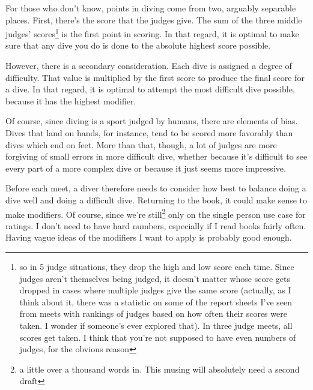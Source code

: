 \documentclass[12pt]{article}[titlepage]
\newcommand{\1}{\={a}}
\newcommand{\2}{\={e}}
\newcommand{\3}{\={\i}}
\newcommand{\4}{\=o}
\newcommand{\5}{\=u}
\newcommand{\6}{\={A}}
\renewcommand{\,}{\textsuperscript{,}}
\begin{document}
For those who don't know, points in diving come from two, arguably separable places.
First, there's the score that the judges give.
The sum of the three middle judges' scores\footnote{so in 5 judge situations, they drop the high and low score each time. Since judges aren't themselves being judged, it doesn't matter whose score gets dropped in cases where multiple judges give the same score (actually, as I think about it, there was a statistic on some of the report sheets I've seen from meets with rankings of judges based on how often their scores were taken. I wonder if someone's ever explored that). In three judge meets, all scores get taken. I think that you're not supposed to have even numbers of judges, for the obvious reason}
is the first point in scoring.
In that regard, it is optimal to make sure that any dive you do is done to the absolute highest score possible.

However, there is a secondary consideration.
Each dive is assigned a degree of difficulty.
That value is multiplied by the first score to produce the final score for a dive.
In that regard, it is optimal to attempt the most difficult dive possible, because it has the highest modifier.

Of course, since diving is a sport judged by humans, there are elements of bias.
Dives that land on hands, for instance, tend to be scored more favorably than dives which end on feet.
More than that, though, a lot of judges are more forgiving of small errors in more difficult dive, whether because it's difficult to see every part of a more complex dive or because it just seems more impressive.

Before each meet, a diver therefore needs to consider how best to balance doing a dive well and doing a difficult dive.
Returning to the book, it could make sense to make modifiers.
Of course, since we're still\footnote{a little over a thousand words in. This musing will absolutely need a second draft} only on the single person use case for ratings.
I don't need to have hard numbers, especially if I read books fairly often.
Having vague ideas of the modifiers I want to apply is probably good enough.
\end{document}
